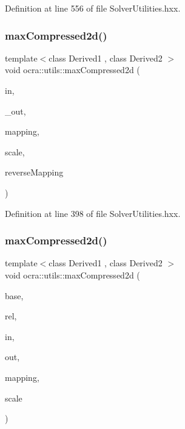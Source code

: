 Definition at line 556 of file Solver\+Utilities.\+hxx.

\hypertarget{namespaceocra_1_1utils_ac4a24bd4a452b6c09129dcf5b7f620a2}{}\label{namespaceocra_1_1utils_ac4a24bd4a452b6c09129dcf5b7f620a2} 
\subsubsection{\texorpdfstring{max\+Compressed2d()}{maxCompressed2d()}\hspace{0.1cm}{\footnotesize\ttfamily [1/2]}}
{\footnotesize\ttfamily template$<$class Derived1 , class Derived2 $>$ \\
void ocra\+::utils\+::max\+Compressed2d (\begin{DoxyParamCaption}\item[{const Matrix\+Base$<$ Derived1 $>$ \&}]{in,  }\item[{Matrix\+Base$<$ Derived2 $>$ const \&}]{\+\_\+out,  }\item[{const std\+::vector$<$ int $>$ \&}]{mapping,  }\item[{double}]{scale,  }\item[{bool}]{reverse\+Mapping }\end{DoxyParamCaption})\hspace{0.3cm}{\ttfamily [inline]}}



Definition at line 398 of file Solver\+Utilities.\+hxx.

\hypertarget{namespaceocra_1_1utils_ab1811bfb0b7d5ab451e9fea88093027e}{}\label{namespaceocra_1_1utils_ab1811bfb0b7d5ab451e9fea88093027e} 
\subsubsection{\texorpdfstring{max\+Compressed2d()}{maxCompressed2d()}\hspace{0.1cm}{\footnotesize\ttfamily [2/2]}}
{\footnotesize\ttfamily template$<$class Derived1 , class Derived2 $>$ \\
void ocra\+::utils\+::max\+Compressed2d (\begin{DoxyParamCaption}\item[{const \hyperlink{classocra_1_1Variable}{Variable} \&}]{base,  }\item[{const \hyperlink{classocra_1_1Variable}{Variable} \&}]{rel,  }\item[{const Matrix\+Base$<$ Derived1 $>$ \&}]{in,  }\item[{Matrix\+Base$<$ Derived2 $>$ const \&}]{out,  }\item[{std\+::vector$<$ int $>$ \&}]{mapping,  }\item[{double}]{scale }\end{DoxyParamCaption})\hspace{0.3cm}{\ttfamily [inline]}}



